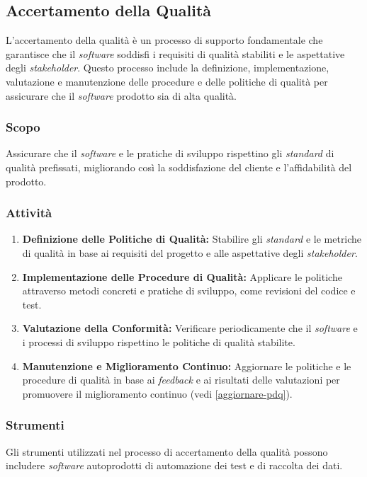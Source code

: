 \subsection{Accertamento della Qualità}

L'accertamento della qualità è un processo di supporto fondamentale che
garantisce che il \textit{software} soddisfi i requisiti di qualità stabiliti e
le aspettative degli \textit{stakeholder}.
Questo processo include la definizione, implementazione, valutazione e
manutenzione delle procedure e delle politiche di qualità per assicurare che
il \textit{software} prodotto sia di alta qualità.

\subsubsection{Scopo}
Assicurare che il \textit{software} e le pratiche di sviluppo rispettino gli
\textit{standard} di qualità prefissati, migliorando così la soddisfazione del cliente e
l'affidabilità del prodotto.

\subsubsection{Attività}
\begin{enumerate}
	\item \textbf{Definizione delle Politiche di Qualità:} Stabilire gli
	      \textit{standard} e le metriche di qualità in base ai requisiti del progetto e
	      alle aspettative degli \textit{stakeholder}.
	\item \textbf{Implementazione delle Procedure di Qualità:} Applicare le
	      politiche attraverso metodi concreti e pratiche di sviluppo, come
	      revisioni del codice e test.
	\item \textbf{Valutazione della Conformità:} Verificare periodicamente che
	      il \textit{software} e i processi di sviluppo rispettino le politiche
	      di qualità stabilite.
	\item \textbf{Manutenzione e Miglioramento Continuo:} Aggiornare le
	      politiche e le procedure di qualità in base ai \textit{feedback\g} e ai
	      risultati delle valutazioni per promuovere il miglioramento continuo
	      (vedi \cref{aggiornare-pdq}).
\end{enumerate}

\subsubsection{Strumenti}
Gli strumenti utilizzati nel processo di accertamento della qualità possono
includere \textit{software} autoprodotti di automazione dei test e di raccolta
dei dati.
